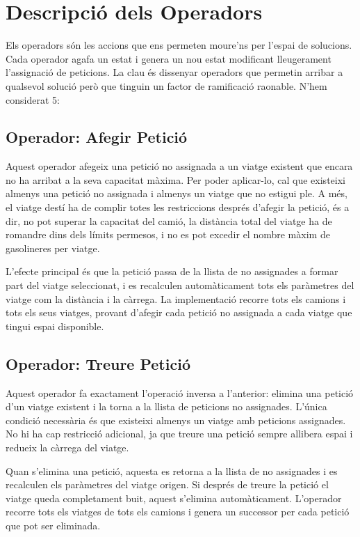 \section{Descripció dels Operadors}

Els operadors són les accions que ens permeten moure'ns per l'espai de solucions. Cada operador agafa un estat i genera un nou estat modificant lleugerament l'assignació de peticions. La clau és dissenyar operadors que permetin arribar a qualsevol solució però que tinguin un factor de ramificació raonable. N'hem considerat 5:

\subsection{Operador: Afegir Petició}

Aquest operador afegeix una petició no assignada a un viatge existent que encara no ha arribat a la seva capacitat màxima. Per poder aplicar-lo, cal que existeixi almenys una petició no assignada i almenys un viatge que no estigui ple. A més, el viatge destí ha de complir totes les restriccions després d'afegir la petició, és a dir, no pot superar la capacitat del camió, la distància total del viatge ha de romandre dins dels límits permesos, i no es pot excedir el nombre màxim de gasolineres per viatge.

L'efecte principal és que la petició passa de la llista de no assignades a formar part del viatge seleccionat, i es recalculen automàticament tots els paràmetres del viatge com la distància i la càrrega. La implementació recorre tots els camions i tots els seus viatges, provant d'afegir cada petició no assignada a cada viatge que tingui espai disponible.

\subsection{Operador: Treure Petició}

Aquest operador fa exactament l'operació inversa a l'anterior: elimina una petició d'un viatge existent i la torna a la llista de peticions no assignades. L'única condició necessària és que existeixi almenys un viatge amb peticions assignades. No hi ha cap restricció adicional, ja que treure una petició sempre allibera espai i redueix la càrrega del viatge.

Quan s'elimina una petició, aquesta es retorna a la llista de no assignades i es recalculen els paràmetres del viatge origen. Si després de treure la petició el viatge queda completament buit, aquest s'elimina automàticament. L'operador recorre tots els viatges de tots els camions i genera un successor per cada petició que pot ser eliminada. 

